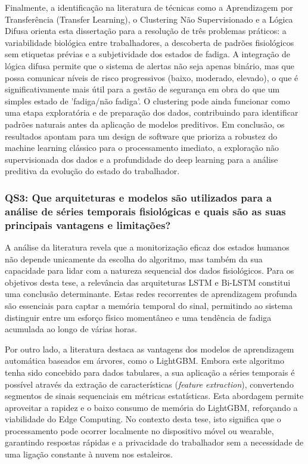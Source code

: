 Finalmente, a identificação na literatura de técnicas como a Aprendizagem por Transferência (Transfer Learning), o Clustering Não Supervisionado e a Lógica Difusa orienta esta dissertação para a resolução de três problemas práticos: a variabilidade biológica entre trabalhadores, a descoberta de padrões fisiológicos sem etiquetas prévias e a subjetividade dos estados de fadiga. A integração de lógica difusa permite que o sistema de alertas não seja apenas binário, mas que possa comunicar níveis de risco progressivos (baixo, moderado, elevado), o que é significativamente mais útil para a gestão de segurança em obra do que um simples estado de 'fadiga/não fadiga'. O clustering pode ainda funcionar como uma etapa exploratória e de preparação dos dados, contribuindo para identificar padrões naturais antes da aplicação de modelos preditivos. Em conclusão, os resultados apontam para um design de software que prioriza a robustez do machine learning clássico para o processamento imediato, a exploração não supervisionada dos dados e a profundidade do deep learning para a análise preditiva da evolução do estado do trabalhador.

\subsubsection*{QS3: Que arquiteturas e modelos são utilizados para a análise de séries temporais fisiológicas e quais são as suas principais vantagens e limitações?}
\label{subsubsec:qs3_analisis}

A análise da literatura revela que a monitorização eficaz dos estados humanos não depende unicamente da escolha do algoritmo, mas também da sua capacidade para lidar com a natureza sequencial dos dados fisiológicos. Para os objetivos desta tese, a relevância das arquiteturas LSTM e Bi-LSTM constitui uma conclusão determinante. Estas redes recorrentes de aprendizagem profunda são essenciais para captar a memória temporal do sinal, permitindo ao sistema distinguir entre um esforço físico momentâneo e uma tendência de fadiga acumulada ao longo de várias horas.

Por outro lado, a literatura destaca as vantagens dos modelos de aprendizagem automática baseados em árvores, como o LightGBM. Embora este algoritmo tenha sido concebido para dados tabulares, a sua aplicação a séries temporais é possível através da extração de características (\textit{feature extraction}), convertendo segmentos de sinais sequenciais em métricas estatísticas. Esta abordagem permite aproveitar a rapidez e o baixo consumo de memória do LightGBM, reforçando a viabilidade do Edge Computing. No contexto desta tese, isto significa que o processamento pode ocorrer localmente no dispositivo móvel ou wearable, garantindo respostas rápidas e a privacidade do trabalhador sem a necessidade de uma ligação constante à nuvem nos estaleiros.

